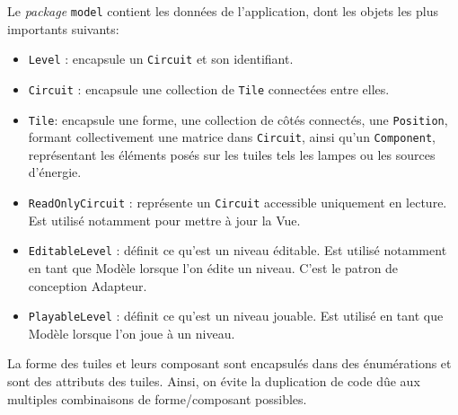 \documentclass{article}
\begin{document}
Le {\em package} {\tt model} contient les données de l'application, dont les
objets les plus importants suivants:
\begin{itemize}
\item {\tt Level} : encapsule un {\tt Circuit} et son identifiant.
\item {\tt Circuit} : encapsule une collection de {\tt Tile} connectées entre
  elles.
\item {\tt Tile}: encapsule une forme, une collection de côtés connectés, une
  {\tt Position}, formant collectivement une matrice dans {\tt Circuit}, ainsi
  qu'un {\tt Component}, représentant les éléments posés sur les tuiles tels les
  lampes ou les sources d'énergie.
\item {\tt ReadOnlyCircuit} : représente un {\tt Circuit} accessible uniquement
  en lecture. Est utilisé notamment pour mettre à jour la Vue.
\item {\tt EditableLevel} : définit ce qu'est un niveau éditable. Est utilisé
  notamment en tant que Modèle lorsque l'on édite un niveau. C'est le patron de
  conception Adapteur.
\item {\tt PlayableLevel} : définit ce qu'est un niveau jouable. Est utilisé en
  tant que Modèle lorsque l'on joue à un niveau.
\end{itemize}

La forme des tuiles et leurs composant sont encapsulés dans des énumérations et
sont des attributs des tuiles. Ainsi, on évite la duplication de code dûe aux
multiples combinaisons de forme/composant possibles.
\end{document}
